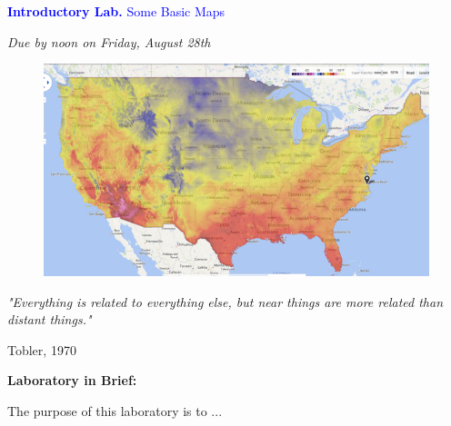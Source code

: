 \documentclass{article}
\begin{document}
\vspace*{.01mm}

\begin{center}

\Large{\textcolor{blue}{\textbf{Introductory Lab.}  Some Basic Maps}}

\vspace{4mm}

\textit{Due by noon on Friday, August 28th}\\

\end{center}

\begin{figure}[h!]
\begin{center}
\includegraphics[width=1.0\textwidth]{weather.png}

\end{center}
\end{figure}

\setlength{\parindent}{0cm}

\large{\textit{"Everything is related to everything else, but near things are more related than distant things."}
\begin{flushright}
Tobler, 1970
\end{flushright}
}




\newpage


\large{\textbf{Laboratory in Brief:}}

\vspace{4mm}

\setlength{\leftskip}{1cm}

\setlength{\parindent}{0cm}

The purpose of this laboratory is to ...

\vspace{4mm}
\end{document}

